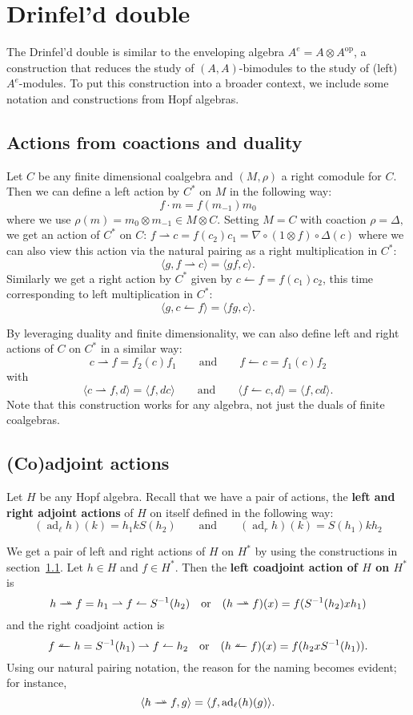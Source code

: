 \documentclass [11pt, proquest] {uwthesis}[2020/02/24]
\newcommand{\doubleharpoonright}{%
  \rightharpoonup\mathrel{\mspace{-15mu}}\rightharpoonup
}
\newcommand{\doubleharpoonleft}{%
  \leftharpoonup\mathrel{\mspace{-15mu}}\leftharpoonup
}
\begin{document}
\section{Drinfel'd double}
    The Drinfel'd double is similar to the enveloping algebra $A^e=A\otimes A^\textrm{op}$, a construction that reduces the study of $(A,A)$-bimodules to the study of (left) $A^e$-modules. To put this construction into a broader context, we include some notation and constructions from Hopf algebras.

\subsection{Actions from coactions and duality}\label{sec:dual-actions}
    Let $C$ be any finite dimensional coalgebra and $(M,\rho)$ a right comodule for $C$. Then we can define a left action by $C^\ast$ on $M$ in the following way:
    \[f\cdot m= f(m_{-1})m_0\]
    where we use $\rho(m)=m_0\otimes m_{-1}\in M\otimes C.$ Setting $M=C$ with coaction $\rho=\Delta,$ we get an action of $C^\ast$ on $C$: $f\rightharpoonup c=f(c_{2})c_1=\nabla\circ (1\otimes f)\circ\Delta (c)$ where we can also view this action via the natural pairing as a right multiplication in $C^\ast:$
    \[\langle g,f\rightharpoonup c\rangle = \langle gf, c\rangle.\]
    Similarly we get a right action by $C^\ast$ given by $c\leftharpoonup f=f(c_1)c_2$, this time corresponding to left multiplication in $C^\ast$:
    \[\langle g,c\leftharpoonup f\rangle = \langle fg, c\rangle.\]
    
    By leveraging duality and finite dimensionality, we can also define left and right actions of $C$ on $C^\ast$ in a similar way:
    \[c\rightharpoonup f = f_2(c)f_1\qquad\text{and}\qquad f\leftharpoonup c = f_1(c)f_2\]
    with 
    \[\langle c\rightharpoonup f, d\rangle = \langle f, dc\rangle\qquad\text{and}\qquad \langle f\leftharpoonup c,d\rangle = \langle f, cd\rangle.\]
    Note that this construction works for any algebra, not just the duals of finite coalgebras.
\subsection{(Co)adjoint actions}
    Let $H$ be any Hopf algebra. Recall that we have a pair of actions, the \textbf{left and right adjoint actions} of $H$ on itself defined in the following way:
    \[(\operatorname{ad}_\ell h)(k)=h_1kS(h_2)\qquad\text{and}\qquad (\operatorname{ad}_r h)(k)=S(h_1)kh_2\]
    
    We get a pair of left and right actions of $H$ on $H^\ast$ by using the constructions in section~\ref{sec:dual-actions}. Let $h\in H$ and $f\in H^\ast$. Then the \textbf{left coadjoint action of $H$ on $H^\ast$} is
    \[h\doubleharpoonright f = h_1\rightharpoonup f \leftharpoonup S^{-1}(h_2)\quad\text{or}\quad (h\doubleharpoonright f)(x)=f(S^{-1}(h_2)xh_1)\]
    and the right coadjoint action is
    \[f\doubleharpoonleft h = S^{-1}(h_1)\rightharpoonup f \leftharpoonup h_2\quad\text{or}\quad (h\doubleharpoonleft f)(x)=f(h_2xS^{-1}(h_1)).\]
    Using our natural pairing notation, the reason for the naming becomes evident; for instance,
    \[\langle h\doubleharpoonright f, g\rangle = \langle f, \operatorname{ad}_\ell(h)(g)\rangle.\]
    
\end{document}
